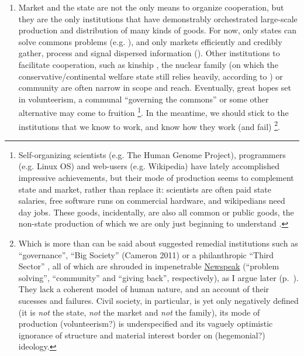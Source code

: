 \documentclass[11pt,a4paper,oneside]{article}
\begin{document}
\begin{enumerate}
	\begin{enumerate} 
		\item Market and the state are not the only means to organize cooperation, but they are the only institutions that have demonstrably orchestrated large-scale production and distribution of many kinds of goods. 
		For now, only states can solve commons problems (e.g. \citealt{Hardin-1968-aa}), and only markets efficiently and credibly gather, process and signal dispersed information (\citealt{Hayek1931}). 
			Other institutions to facilitate cooperation, such as kinship \citep{Van-den-Berghe-1981-aa,Hammond2006}, the nuclear family (on which the conservative/continental welfare state still relies heavily, according to \citealt{Esping-Andersen-1990-aa}) or community \citep{Ostrom1990} are often narrow in scope and reach. 
		Eventually, great hopes set in volunteerism, a communal ``governing the commons'' \citep{Ostrom1990} or some other alternative may come to fruition
		\footnote{
			Self-organizing scientists (e.g. The Human Genome Project), programmers (e.g. Linux OS) and web-users (e.g. Wikipedia) have lately accomplished impressive achievements, but their mode of production seems to complement state and market, rather than replace it: 
			scientists are often paid state salaries, free software runs on commercial hardware, and wikipedians need day jobs. 
			These goods, incidentally, are also all common or public goods, the non-state production of which we are only just beginning to understand \citep{Ostrom1990}.
		}. 
		In the meantime, we should stick to the institutions that we know to work, and know how they work (and fail)
			\footnote{
				Which is more than can be said about suggested remedial institutions such as ``governance'', ``Big Society'' (Cameron 2011) or a philanthropic ``Third Sector'' \citep{Anheier2002}, all of which are shrouded in impenetrable \hyperref[sec:newspeak]{Newspeak} (``problem solving'', ``community'' and ``giving back'', respectively), as I argue later (p.~\pageref{sec:newspeak}). 
				They lack a coherent model of human nature, and an account of their sucesses and failures. Civil society, in particular, is yet only negatively defined (it is \emph{not} the state, \emph{not} the market and \emph{not} the family), its mode of production (volunteerism?) is underspecified and its vaguely optimistic ignorance of structure and material interest border on (hegemonial?) ideology.
			}.
			

\end{enumerate}
\end{enumerate}
\end{document}
